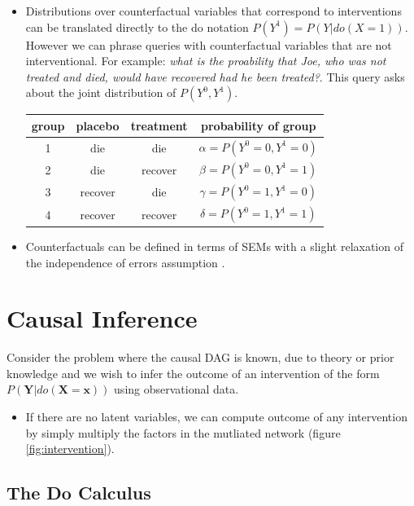 \documentclass[b0,landscape,25pt]{sciposter}
\begin{document}
\begin{multicols}{5}
\begin{itemize}
\item Distributions over counterfactual variables that correspond to interventions can be translated directly to the do notation $P(Y^{1}) = P(Y|do(X=1))$. However we can phrase queries with counterfactual variables that are not interventional. For example: \textit{what is the proability that Joe, who was not treated and died, would have recovered had he been treated?}. This query asks about the joint distribution of $P(Y^{0},Y^{1})$. 

\begin{center}
\begin{tabular}{c|c|c|c}
group & placebo & treatment & probability of group\\
\hline
1 & die & die & $\alpha=P(Y^{0}=0,Y^{1}=0)$\\
2 & die & recover & $\beta=P(Y^{0}=0,Y^{1}=1)$\\
3 & recover & die & $\gamma=P(Y^{0}=1,Y^{1}=0)$\\
4 & recover & recover & $\delta=P(Y^{0}=1,Y^{1}=1)$\\
\end{tabular}
\end{center}

\item Counterfactuals can be defined in terms of SEMs with a slight relaxation of the independence of errors assumption \cite{Richardson2013}. 
\end{itemize}



\section*{Causal Inference}

Consider the problem where the causal DAG is known, due to theory or prior knowledge and we wish to infer the outcome of an intervention of the form $P(\boldsymbol{Y}|do(\boldsymbol{X}=\boldsymbol{x}))$ using observational data.

\begin{itemize}
\item If there are no latent variables, we can compute outcome of any intervention by simply multiply the factors in the mutliated network (figure \ref{fig:intervention}).
\end{itemize}



\subsection*{The Do Calculus}


\end{multicols}
\end{document}
